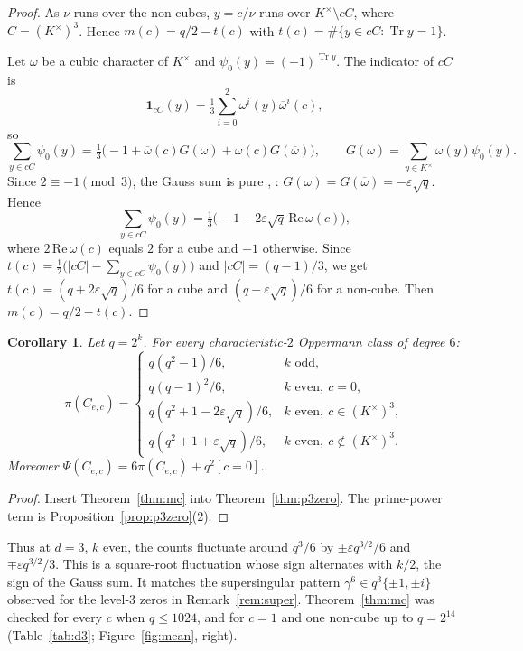 \documentclass[11pt,a4paper]{amsart}
\newtheorem{corollary}[theorem]{Corollary}
\theoremstyle{definition}
\theoremstyle{remark}
\newcommand{\Tr}{\operatorname{Tr}}
\begin{document}
\begin{proof}
As $\nu$ runs over the non-cubes, $y=c/\nu$ runs over $K^\times\setminus cC$, where $C=(K^\times)^3$. Hence
$m(c)=q/2-t(c)$ with $t(c)=\#\{y\in cC:\Tr y=1\}$.

Let $\omega$ be a cubic character of $K^\times$ and $\psi_0(y)=(-1)^{\Tr y}$. The indicator of $cC$ is
\[
\mathbf 1_{cC}(y)=\tfrac13\textstyle\sum_{i=0}^2\omega^i(y)\overline\omega^i(c),
\]
so
\[
\sum_{y\in cC}\psi_0(y)=\tfrac13\bigl(-1+\overline\omega(c)G(\omega)+\omega(c)G(\overline\omega)\bigr),\qquad
G(\omega)=\sum_{y\in K^\times}\omega(y)\psi_0(y).
\]
Since $2\equiv-1\pmod3$, the Gauss sum is pure \cite{Stickelberger1890}, \cite[\S11.6]{BEW}:
$G(\omega)=G(\overline\omega)=-\varepsilon\sqrt q$. Hence
\[
\sum_{y\in cC}\psi_0(y)=\tfrac13\bigl(-1-2\varepsilon\sqrt q\,\mathrm{Re}\,\omega(c)\bigr),
\]
where $2\,\mathrm{Re}\,\omega(c)$ equals $2$ for a cube and $-1$ otherwise. Since
$t(c)=\frac12\bigl(|cC|-\sum_{y\in cC}\psi_0(y)\bigr)$ and $|cC|=(q-1)/3$, we get $t(c)=(q+2\varepsilon\sqrt q)/6$
for a cube and $(q-\varepsilon\sqrt q)/6$ for a non-cube. Then $m(c)=q/2-t(c)$.
\end{proof}

\begin{corollary}\label{cor:d3}
Let $q=2^k$. For every characteristic-$2$ Oppermann class of degree $6$:
\[
\pi(C_{e,c})=\begin{cases}
q(q^2-1)/6, & k\text{ odd},\\
q(q-1)^2/6, & k\text{ even},\ c=0,\\
q(q^2+1-2\varepsilon\sqrt q)/6, & k\text{ even},\ c\in(K^\times)^3,\\
q(q^2+1+\varepsilon\sqrt q)/6, & k\text{ even},\ c\notin(K^\times)^3.
\end{cases}
\]
Moreover $\Psi(C_{e,c})=6\pi(C_{e,c})+q^2[c=0]$.
\end{corollary}

\begin{proof}
Insert Theorem~\ref{thm:mc} into Theorem~\ref{thm:p3zero}. The prime-power term is Proposition~\ref{prop:p3zero}(2).
\end{proof}

Thus at $d=3$, $k$ even, the counts fluctuate around $q^3/6$ by $\pm\varepsilon q^{3/2}/6$ and $\mp\varepsilon
q^{3/2}/3$. This is a square-root fluctuation whose sign alternates with $k/2$, the sign of the Gauss sum. It matches
the supersingular pattern $\gamma^6\in q^3\{\pm1,\pm i\}$ observed for the level-$3$ zeros in
Remark~\ref{rem:super}. Theorem~\ref{thm:mc} was checked for every $c$ when $q\le1024$, and for $c=1$ and one
non-cube up to $q=2^{14}$ (Table~\ref{tab:d3}; Figure~\ref{fig:mean}, right).
\end{document}
